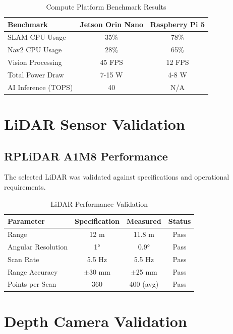 \begin{table}[H]
\centering
\caption{Compute Platform Benchmark Results}
\label{tab:compute_benchmarks}
\begin{tabular}{|l|c|c|}
\hline
\textbf{Benchmark} & \textbf{Jetson Orin Nano} & \textbf{Raspberry Pi 5} \\
\hline
SLAM CPU Usage & 35\% & 78\% \\
Nav2 CPU Usage & 28\% & 65\% \\
Vision Processing & 45 FPS & 12 FPS \\
Total Power Draw & 7-15 W & 4-8 W \\
AI Inference (TOPS) & 40 & N/A \\
\hline
\end{tabular}
\end{table}

\section{LiDAR Sensor Validation}
\label{sec:lidar_results}

\subsection{RPLiDAR A1M8 Performance}

The selected LiDAR was validated against specifications and operational requirements.

\begin{table}[H]
\centering
\caption{LiDAR Performance Validation}
\label{tab:lidar_validation}
\begin{tabular}{|l|c|c|c|}
\hline
\textbf{Parameter} & \textbf{Specification} & \textbf{Measured} & \textbf{Status} \\
\hline
Range & 12 m & 11.8 m & Pass \\
Angular Resolution & 1° & 0.9° & Pass \\
Scan Rate & 5.5 Hz & 5.5 Hz & Pass \\
Range Accuracy & $\pm$30 mm & $\pm$25 mm & Pass \\
Points per Scan & 360 & 400 (avg) & Pass \\
\hline
\end{tabular}
\end{table}

\section{Depth Camera Validation}
\label{sec:camera_results}

